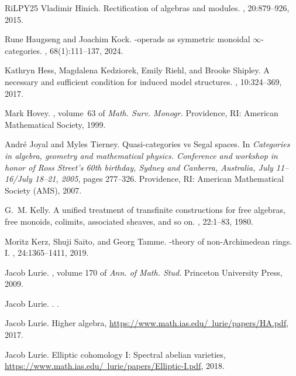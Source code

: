 \documentclass[a4paper,12pt]{amsart}
\theoremstyle{plain}
\theoremstyle{definition}
\theoremstyle{remark}
\begin{document}
\begin{thebibliography}{RiLPY25}
Vladimir Hinich.
\newblock Rectification of algebras and modules.
, 20:879--926, 2015.

Rune Haugseng and Joachim Kock.
\newblock {{\(\infty\)}}-operads as symmetric monoidal
  {{\(\infty\)}}-categories.
, 68(1):111--137, 2024.

Kathryn Hess, Magdalena Kedziorek, Emily Riehl, and Brooke Shipley.
\newblock A necessary and sufficient condition for induced model structures.
, 10:324--369, 2017.

Mark Hovey.
, volume~63 of {\em Math. Surv. Monogr.}
\newblock Providence, RI: American Mathematical Society, 1999.

Andr{\'e} Joyal and Myles Tierney.
\newblock Quasi-categories vs {Segal} spaces.
\newblock In {\em Categories in algebra, geometry and mathematical physics.
  Conference and workshop in honor of Ross Street's 60th birthday, Sydney and
  Canberra, Australia, July 11--16/July 18--21, 2005}, pages 277--326.
  Providence, RI: American Mathematical Society (AMS), 2007.

G.~M. Kelly.
\newblock A unified treatment of transfinite constructions for free algebras,
  free monoids, colimits, associated sheaves, and so on.
, 22:1--83, 1980.

Moritz Kerz, Shuji Saito, and Georg Tamme.
-theory of non-{Archimedean} rings. {I}.
, 24:1365--1411, 2019.

Jacob Lurie.
, volume 170 of {\em Ann. of Math. Stud.}
\newblock Princeton University Press, 2009.

Jacob Lurie.
.
.

Jacob Lurie.
\newblock Higher algebra,
  \href{https://www.math.ias.edu/~lurie/papers/HA.pdf}{https://www.math.ias.edu/~lurie/papers/HA.pdf},
  2017.

Jacob Lurie.
\newblock Elliptic cohomology {I}: Spectral abelian varieties,
  \href{https://www.math.ias.edu/~lurie/papers/Elliptic-I.pdf}{https://www.math.ias.edu/~lurie/papers/Elliptic-I.pdf},
  2018.


\end{thebibliography}
\end{document}
